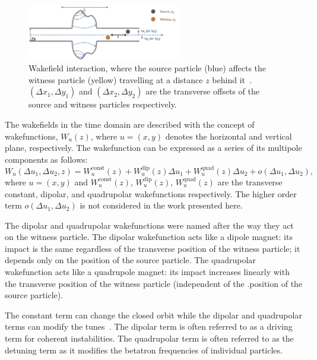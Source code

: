 \begin{figure}[!h] %
    \centering         
    \includegraphics[width=0.6\textwidth]{images/Ch2/wakefield_example.png}
        \caption{Wakefield interaction, where the source particle (blue) affects the witness particle (yellow) travelling at a distance $z$ behind it~\cite{instabilities_rumulo_li}. $(\Delta x_1, \Delta y_1)$ and $ (\Delta x_2, \Delta y_2)$ are the transverse offsets of the source and witness particles respectively.} 
        \label{fig:wakefields}
 \end{figure}

The wakefields in the time domain are described with the concept of wakefunctions, $W_u(z)$, where $u=(x,y)$ denotes the horizontal and vertical plane, respectively. The wakefunction can be expressed as a series of its multipole components as follows: %
\begin{equation}\label{eq:wakefunctions}
    W_u(\Delta u_1, \Delta u_2, z) = W^\mathrm{const}_u(z) + W^\mathrm{dip}_u(z)\Delta u_1 +  W^\mathrm{quad}_u(z)\Delta u_2 + o(\Delta u_1, \Delta u_2),
\end{equation}
where $u=(x,y)$ and $W^\mathrm{const}_u(z)$, $W^\mathrm{dip}_u(z)$, $W^\mathrm{quad}_u(z)$ are the transverse constant, dipolar, and quadrupolar wakefunctions respectively. The higher order term $ o(\Delta u_1, \Delta u_2)$ is not considered in the work presented here. %

The dipolar and quadrupolar wakefunctions were named after the way they act on the witness particle. The dipolar wakefunction acts like a dipole magnet: its impact is the same regardless of the transverse position of the witness particle; it depends only on the position of the source particle. The quadrupolar wakefunction acts like a quadrupole magnet: its impact increases linearly with the transverse position of the witness particle (independent of the .position of the source particle). %

The constant term can change the closed orbit while the dipolar and quadrupolar terms can modify the tunes~\cite{benoit_ipac19_impedance}. The dipolar term is often referred to as a driving term for coherent instabilities. The quadrupolar term is often referred to as the detuning term as it modifies the betatron frequencies of individual particles. %


